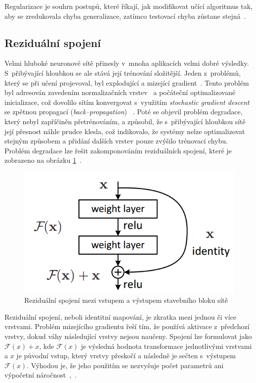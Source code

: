 
Regularizace je souhrn postupů, které říkají, jak modifikovat učící algoritmus tak, aby se zredukovala chyba generalizace, zatímco testovací chyba zůstane stejná~\cite{mitdeeplearning}.


\subsection{Reziduální spojení}
Velmi hluboké neuronové sítě přinesly v~mnoha aplikacích velmi dobré výsledky. S~přibývající hloubkou se ale stává její trénování složitější. Jeden z~problémů, který se při učení projevoval, byl explodující a mizející gradient~\cite{279181}. Tento problém byl adresován zavedením normalizačních vrstev~\cite{ioffe2015batch} a počáteční optimalizované inicializace, což dovolilo sítím konvergovat s~využitím \textit{stochastic gradient descent} se zpětnou propagací (\textit{back--propagation})~ \cite{6795724}. Poté se objevil problém degradace, který nebyl zapříčiněn přetrénováním, a způsobil, že s~přibývající hloubkou sítě její přesnost náhle prudce klesla, což indikovalo, že systémy nelze optimalizovat stejným způsobem a přidání dalších vrstev pouze zvýšilo trénovací chybu. Problém degradace lze řešit zakomponováním reziduálních spojení, které je zobrazeno na obrázku \ref{fig:residualconnection}~\cite{he2015deep}.

\begin{figure}[H]
    \centering
    \includegraphics[scale=0.5]{obrazky-figures/residual_connection.png}
    \caption{\label{fig:residualconnection}Reziduální spojení mezi vstupem a výstupem stavebního bloku sítě~\cite{he2015deep}}
\end{figure}

Reziduální spojení, neboli identitní mapování, je zkratka mezi jednou či více vrstvami. Problém mizejícího gradientu řeší tím, že používá aktivace z~předchozí vrstvy, dokud váhy následující vrstvy nejsou naučeny. Spojení lze formulovat jako $\mathcal{F}(x) + x$, kde $\mathcal{F}(x)$ je výsledná hodnota transformace jednotlivými vrstvami a $x$ je původní vstup, který vrstvy přeskočí a následně je sečten s~výstupem $\mathcal{F}(x)$. Výhodou je, že jeho použitím se nezvyšuje počet parametrů ani výpočetní náročnost~\cite{he2015deep},~\cite{zaeemzadeh2018normpreservation}.



